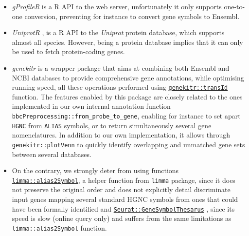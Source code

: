 \begin{itemize}
\item
  \emph{gProfileR} \autocite{R-gProfileR} is a R API to the web server, unfortunately it only supports one-to-one conversion, preventing for instance to convert gene symbols to Ensembl.
\item
  \emph{UniprotR} \autocite{R-UniprotR}, \autocite{UniprotR2020} is a R API to the \emph{Uniprot} protein database, which supports almost all species. However, being a protein database implies that it can only be used to fetch protein-coding genes.
\item
  \emph{genekitr} \autocite{R-genekitr} is a wrapper package that aims at combining both Ensembl and NCBI databases to provide comprehensive gene annotations, while optimising running speed, all these operations performed using \href{https://rdrr.io/pkg/genekitr/man/transId.html}{\texttt{genekitr::transId}} function. The features enabled by this package are closely related to the ones implemented in our own internal annotation function \texttt{bbcPreprocessing::from\_probe\_to\_gene}, enabling for instance to set apart \texttt{HGNC} from \texttt{ALIAS} symbols, or to return simultaneously several gene nomenclatures. In addition to our own implementation, it allows through \href{https://rdrr.io/pkg/genekitr/man/plotVenn.html}{\texttt{genekitr::plotVenn}} to quickly identify overlapping and unmatched gene sets between several databases.
\item
  On the contrary, we strongly deter from using functions \href{https://rdrr.io/pkg/limma/man/alias2Symbol.html}{\texttt{limma::alias2Symbol}}, a helper function from \texttt{limma} package, since it does not preserve the original order and does not explicitly detail discriminate input genes mapping several standard HGNC symbols from ones that could have been formally identified and \href{https://satijalab.org/seurat/reference/UpdateSymbolList.html}{\texttt{Seurat::GeneSymbolThesarus}} , since its speed is slow (online query only) and suffers from the same limitations as \texttt{limma::alias2Symbol} function.
\end{itemize}


%








